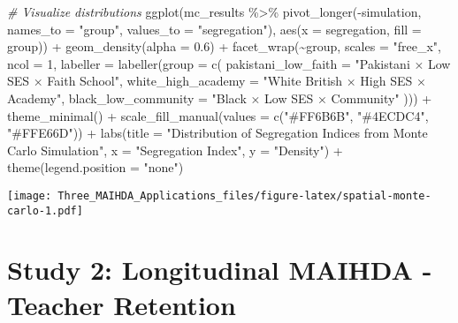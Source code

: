\documentclass[
]{article}
\newenvironment{Shaded}{\begin{snugshade}}{\end{snugshade}}
\newcommand{\AttributeTok}[1]{\textcolor[rgb]{0.77,0.63,0.00}{#1}}
\newcommand{\CommentTok}[1]{\textcolor[rgb]{0.56,0.35,0.01}{\textit{#1}}}
\newcommand{\DecValTok}[1]{\textcolor[rgb]{0.00,0.00,0.81}{#1}}
\newcommand{\FloatTok}[1]{\textcolor[rgb]{0.00,0.00,0.81}{#1}}
\newcommand{\FunctionTok}[1]{\textcolor[rgb]{0.00,0.00,0.00}{#1}}
\newcommand{\NormalTok}[1]{#1}
\newcommand{\SpecialCharTok}[1]{\textcolor[rgb]{0.00,0.00,0.00}{#1}}
\newcommand{\StringTok}[1]{\textcolor[rgb]{0.31,0.60,0.02}{#1}}
\begin{document}
\begin{Shaded}
\begin{Highlighting}[]
\CommentTok{\# Visualize distributions}
\FunctionTok{ggplot}\NormalTok{(mc\_results }\SpecialCharTok{\%\textgreater{}\%} 
         \FunctionTok{pivot\_longer}\NormalTok{(}\SpecialCharTok{{-}}\NormalTok{simulation, }\AttributeTok{names\_to =} \StringTok{"group"}\NormalTok{, }\AttributeTok{values\_to =} \StringTok{"segregation"}\NormalTok{),}
       \FunctionTok{aes}\NormalTok{(}\AttributeTok{x =}\NormalTok{ segregation, }\AttributeTok{fill =}\NormalTok{ group)) }\SpecialCharTok{+}
  \FunctionTok{geom\_density}\NormalTok{(}\AttributeTok{alpha =} \FloatTok{0.6}\NormalTok{) }\SpecialCharTok{+}
  \FunctionTok{facet\_wrap}\NormalTok{(}\SpecialCharTok{\textasciitilde{}}\NormalTok{group, }\AttributeTok{scales =} \StringTok{"free\_x"}\NormalTok{, }\AttributeTok{ncol =} \DecValTok{1}\NormalTok{,}
             \AttributeTok{labeller =} \FunctionTok{labeller}\NormalTok{(}\AttributeTok{group =} \FunctionTok{c}\NormalTok{(}
               \AttributeTok{pakistani\_low\_faith =} \StringTok{"Pakistani × Low SES × Faith School"}\NormalTok{,}
               \AttributeTok{white\_high\_academy =} \StringTok{"White British × High SES × Academy"}\NormalTok{,}
               \AttributeTok{black\_low\_community =} \StringTok{"Black × Low SES × Community"}
\NormalTok{             ))) }\SpecialCharTok{+}
  \FunctionTok{theme\_minimal}\NormalTok{() }\SpecialCharTok{+}
  \FunctionTok{scale\_fill\_manual}\NormalTok{(}\AttributeTok{values =} \FunctionTok{c}\NormalTok{(}\StringTok{"\#FF6B6B"}\NormalTok{, }\StringTok{"\#4ECDC4"}\NormalTok{, }\StringTok{"\#FFE66D"}\NormalTok{)) }\SpecialCharTok{+}
  \FunctionTok{labs}\NormalTok{(}\AttributeTok{title =} \StringTok{"Distribution of Segregation Indices from Monte Carlo Simulation"}\NormalTok{,}
       \AttributeTok{x =} \StringTok{"Segregation Index"}\NormalTok{,}
       \AttributeTok{y =} \StringTok{"Density"}\NormalTok{) }\SpecialCharTok{+}
  \FunctionTok{theme}\NormalTok{(}\AttributeTok{legend.position =} \StringTok{"none"}\NormalTok{)}
\end{Highlighting}
\end{Shaded}

\texttt{[image: Three\_MAIHDA\_Applications\_files/figure-latex/spatial-monte-carlo-1.pdf]}

\hypertarget{study-2-longitudinal-maihda---teacher-retention}{%
\section{Study 2: Longitudinal MAIHDA - Teacher
Retention}\label{study-2-longitudinal-maihda---teacher-retention}}
\end{document}
